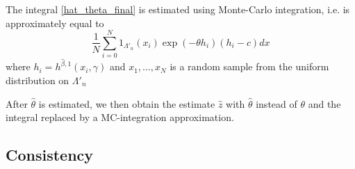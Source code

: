 The integral \ref{hat_theta_final} is estimated using Monte-Carlo integration, i.e. is approximately equal to
$$ \frac 1N \sum_{i=0}^N 1_{\Lambda'_n}(x_i) \exp{\left( - \theta h_i \right )} (h_i- c) dx $$
where $h_i = h^{\hat\beta,1}(x_i, \gamma)$ and $x_1,\dots,x_N$ is a random sample from the uniform distribution on $\Lambda'_n$

After $\hat\theta$ is estimated, we then obtain the estimate $\hat z$ with $\hat\theta$ instead of $\theta$ and the integral replaced by a MC-integration approximation.


\subsection{Consistency}
\tbd
